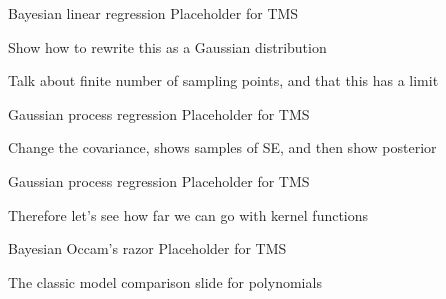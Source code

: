 \begin{frame}{Bayesian linear regression}
  Placeholder for TMS
  
  Show how to rewrite this as a Gaussian distribution
  
  Talk about finite number of sampling points, and that this has a limit
\end{frame}

\begin{frame}{Gaussian process regression}
  Placeholder for TMS
  
  Change the covariance, shows samples of SE, and then show posterior
\end{frame}


\begin{frame}{Gaussian process regression}
  Placeholder for TMS
  
  Therefore let's see how far we can go with kernel functions
\end{frame}

\begin{frame}{Bayesian Occam's razor}
  Placeholder for TMS
  
  The classic model comparison slide for polynomials
\end{frame}